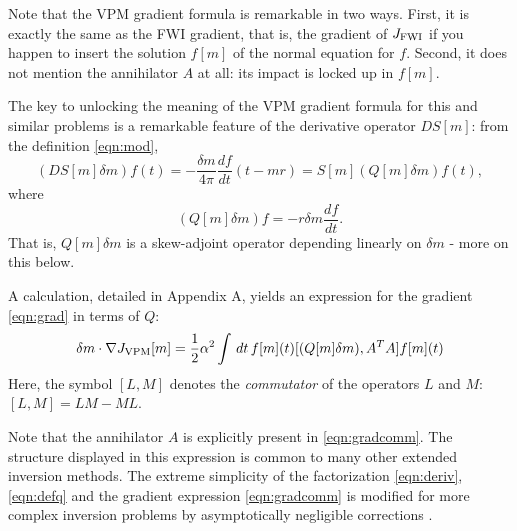 Note that the VPM gradient formula is remarkable in two ways. First,
it is exactly the same as the FWI gradient, that is, the gradient of
$J_{\rm FWI}$ if you happen to insert the solution $f[m]$ of the
normal equation for $f$. Second, it does not mention the annihilator
$A$ at all: its impact is locked up in $f[m]$.

The key to unlocking the meaning of the VPM gradient formula for this
and similar problems is a remarkable feature of the derivative
operator $DS[m]$: from the definition \ref{eqn:mod},
\begin{equation}
\label{eqn:deriv}
(DS[m]\delta m)f (t) = -\frac{\delta m}{4\pi}\frac{df}{dt}(t-mr) = S[m](Q[m]\delta m)f (t),
\end{equation}
where 
\begin{equation}
\label{eqn:defq}
(Q[m]\delta m)f = -r\delta m \frac{df}{dt}.
\end{equation}
That is, $Q[m]\delta m$ is a skew-adjoint operator depending linearly
on $\delta m$ - more on this below.

A calculation, detailed in Appendix A, yields an expression for the
gradient \ref{eqn:grad} in terms of $Q$:
\begin{equation}
\label{eqn:gradcomm}
\delta m \cdot \nabla J_{\rm VPM}[m] = \frac{1}{2}\alpha^2\int \,dt\,f[m](t)[(Q[m]\delta m),A^TA]f[m](t)
\end{equation}
Here, the symbol $[L,M]$ denotes the {\em commutator} of the operators
$L$ and $M$: $[L,M]=LM-ML$.

Note that the annihilator $A$ is explicitly present in
\ref{eqn:gradcomm}. The structure displayed in this expression is
common to many other extended inversion methods. The extreme
simplicity of the factorization \ref{eqn:deriv}, \ref{eqn:defq} and
the gradient expression \ref{eqn:gradcomm} is
modified for more complex inversion problems by asymptotically
negligible corrections \cite[]{Symes:IPTA14,tenKroode:IPTA14,Symes:Madrid}.


